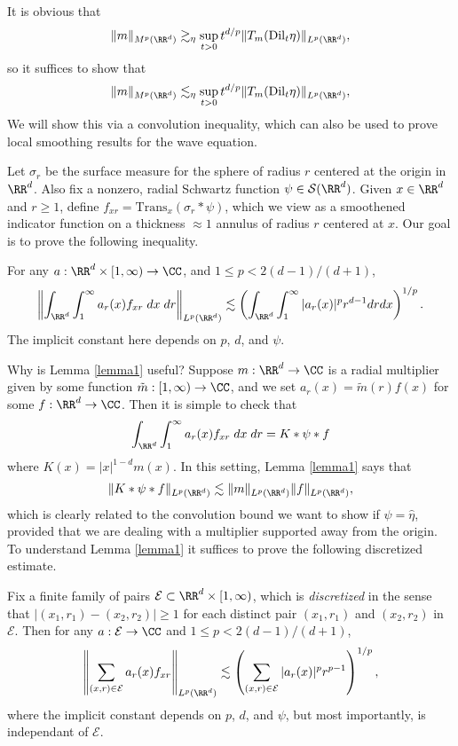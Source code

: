 It is obvious that
%
\[ \| m \|_{M^p(\RR^d)} \gtrsim_\eta \sup_{t > 0} t^{d/p} \| T_m(\text{Dil}_t \eta) \|_{L^p(\RR^d)}, \]
%
so it suffices to show that
%
\[ \| m \|_{M^p(\RR^d)} \lesssim_\eta \sup_{t > 0} t^{d/p} \| T_m(\text{Dil}_t \eta) \|_{L^p(\RR^d)}, \]
%
We will show this via a convolution inequality, which can also be used to prove local smoothing results for the wave equation.

Let $\sigma_r$ be the surface measure for the sphere of radius $r$ centered at the origin in $\RR^d$. Also fix a nonzero, radial Schwartz function $\psi \in \mathcal{S}(\RR^d)$. Given $x \in \RR^d$ and $r \geq 1$, define $f_{x r} = \text{Trans}_x (\sigma_r * \psi)$, which we view as a smoothened indicator function on a thickness $\approx 1$ annulus of radius $r$ centered at $x$. Our goal is to prove the following inequality.

\begin{lemma} \label{lemma1}
    For any $a : \RR^d \times [1,\infty) \to \CC$, and $1 \leq p < 2(d-1)/(d+1)$,
    \[ \left\| \int_{\RR^d} \int_1^\infty a_r(x) f_{x r}\; dx\; dr \right\|_{L^p(\RR^d)} \lesssim \left( \int_{\RR^d} \int_1^\infty |a_r(x)|^p r^{d-1} dr dx \right)^{1/p}. \]
    The implicit constant here depends on $p$, $d$, and $\psi$.
\end{lemma}

Why is Lemma \ref{lemma1} useful? Suppose $m: \RR^d \to \CC$ is a radial multiplier given by some function $\tilde{m}: [1,\infty) \to \CC$, and we set $a_r(x) = \tilde{m}(r) f(x)$ for some $f: \RR^d \to \CC$. Then it is simple to check that
%
\[ \int_{\RR^d} \int_1^\infty a_r(x) f_{x r}\; dx\; dr = K * \psi * f \]
%
where $K(x) = |x|^{1-d} m(x)$. In this setting, Lemma \ref{lemma1} says that
%
\[ \| K * \psi * f \|_{L^p(\RR^d)} \lesssim \| m \|_{L^p(\RR^d)} \| f \|_{L^p(\RR^d)}, \]
%
which is clearly related to the convolution bound we want to show if $\psi = \widehat{\eta}$, provided that we are dealing with a multiplier supported away from the origin. To understand Lemma \ref{lemma1} it suffices to prove the following discretized estimate.

\begin{theorem} \label{lemma2}
    Fix a finite family of pairs $\mathcal{E} \subset \RR^d \times [1,\infty)$, which is \emph{discretized} in the sense that $|(x_1,r_1) - (x_2,r_2)| \geq 1$ for each distinct pair $(x_1,r_1)$ and $(x_2,r_2)$ in $\mathcal{E}$. Then for any $a: \mathcal{E} \to \CC$ and $1 \leq p < 2(d - 1)/(d+1)$, 
    \[ \left\| \sum_{(x,r) \in \mathcal{E}} a_r(x) f_{x r} \right\|_{L^p(\RR^d)} \lesssim \left( \sum_{(x,r) \in \mathcal{E}} |a_r(x)|^p r^{p-1} \right)^{1/p}, \]
    where the implicit constant depends on $p$, $d$, and $\psi$, but most importantly, is independant of $\mathcal{E}$.
\end{theorem}

